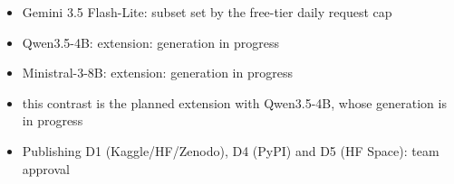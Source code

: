 \begin{itemize}\setlength{\itemsep}{0pt}
  \item Gemini 3.5 Flash-Lite: subset set by the free-tier daily request cap
  \item Qwen3.5-4B: extension: generation in progress
  \item Ministral-3-8B: extension: generation in progress
  \item this contrast is the planned extension with Qwen3.5-4B, whose generation is in progress
  \item Publishing D1 (Kaggle/HF/Zenodo), D4 (PyPI) and D5 (HF Space): team approval
\end{itemize}

